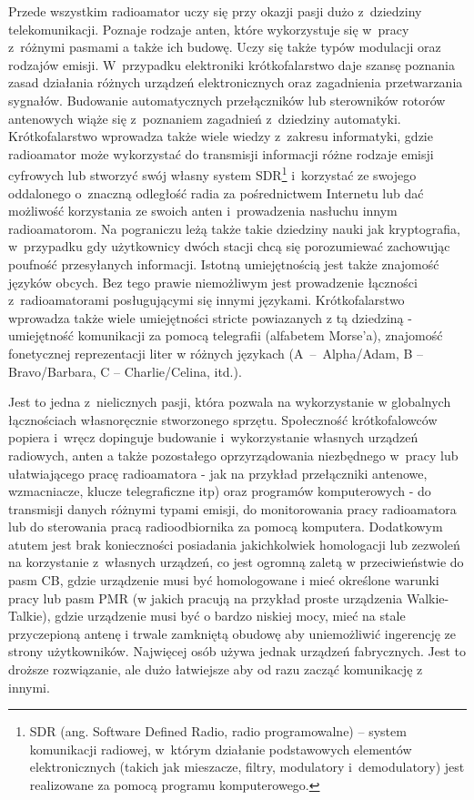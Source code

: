 \documentclass[]{mgr}
\begin{document}
            Przede wszystkim radioamator uczy się przy okazji pasji dużo z~dziedziny telekomunikacji. Poznaje rodzaje anten, które wykorzystuje się w~pracy z~różnymi pasmami a także ich budowę. Uczy się także typów modulacji oraz rodzajów emisji. W~przypadku elektroniki krótkofalarstwo daje szansę poznania zasad działania różnych urządzeń elektronicznych oraz zagadnienia przetwarzania sygnałów. Budowanie automatycznych przełączników lub sterowników rotorów antenowych wiąże się z~poznaniem zagadnień z~dziedziny automatyki. Krótkofalarstwo wprowadza także wiele wiedzy z~zakresu informatyki, gdzie radioamator może wykorzystać do transmisji informacji różne rodzaje emisji cyfrowych lub stworzyć swój własny system SDR\footnote{SDR (ang. Software Defined Radio, radio programowalne) – system komunikacji radiowej, w~którym działanie podstawowych elementów elektronicznych (takich jak mieszacze, filtry, modulatory i~demodulatory) jest realizowane za pomocą programu komputerowego.} i~korzystać ze swojego oddalonego o~znaczną odległość radia za pośrednictwem Internetu lub dać możliwość korzystania ze swoich anten i~prowadzenia nasłuchu innym radioamatorom. Na pograniczu leżą także takie dziedziny nauki jak kryptografia, w~przypadku gdy użytkownicy dwóch stacji chcą się porozumiewać zachowując poufność przesyłanych informacji. Istotną umiejętnością jest także znajomość języków obcych. Bez tego prawie niemożliwym jest prowadzenie łączności z~radioamatorami posługującymi się innymi językami. Krótkofalarstwo wprowadza także wiele umiejętności stricte powiazanych z tą dziedziną - umiejętność komunikacji za pomocą telegrafii (alfabetem Morse'a), znajomość fonetycznej reprezentacji liter w różnych językach (\mbox{A -- Alpha/Adam}, B -- Bravo/Barbara, C -- Charlie/Celina, itd.).

            Jest to jedna z~nielicznych pasji, która pozwala na wykorzystanie w globalnych łącznościach własnoręcznie stworzonego sprzętu. Społeczność krótkofalowców popiera i~wręcz dopinguje budowanie i~wykorzystanie własnych urządzeń radiowych, anten a także pozostałego oprzyrządowania niezbędnego w~pracy lub ułatwiającego pracę radioamatora - jak na przykład przełączniki antenowe, wzmacniacze, klucze telegraficzne itp) oraz programów komputerowych - do transmisji danych różnymi typami emisji, do monitorowania pracy radioamatora lub do sterowania pracą radioodbiornika za pomocą komputera. Dodatkowym atutem jest brak konieczności posiadania jakichkolwiek homologacji lub zezwoleń na korzystanie z~własnych urządzeń, co jest ogromną zaletą w przeciwieństwie do pasm CB, gdzie urządzenie musi być homologowane i mieć określone warunki pracy lub pasm PMR (w jakich pracują na przykład proste urządzenia Walkie-Talkie), gdzie urządzenie musi być o bardzo niskiej mocy, mieć na stale przyczepioną antenę i trwale zamkniętą obudowę aby uniemożliwić ingerencję ze strony użytkowników. Najwięcej osób używa jednak urządzeń fabrycznych. Jest to droższe rozwiązanie, ale dużo łatwiejsze aby od razu zacząć komunikację z innymi.
\end{document}
